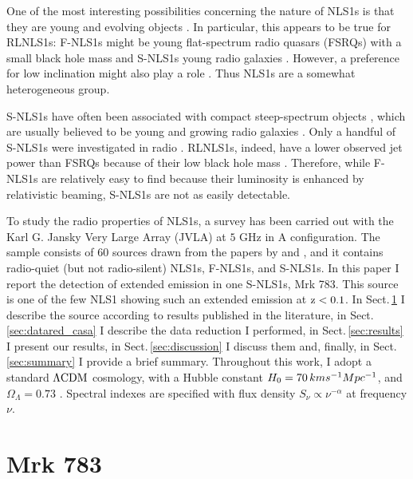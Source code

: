 \documentclass[../thesis.tex]{subfiles}
\begin{document}
One of the most interesting possibilities concerning the nature of NLS1s is that they are young and evolving objects \citep{Mathur00}.
In particular, this appears to be true for RLNLS1s: F-NLS1s might be young flat-spectrum radio quasars (FSRQs) with a small black hole mass and S-NLS1s young radio galaxies \citep{Foschini15, Berton16c}.
However, a preference for low inclination might also play a role \citep[e.g.,][]{Shen14,Peterson11}.
Thus NLS1s are a somewhat heterogeneous group.

S-NLS1s have often been associated with compact steep-spectrum objects \citep[CSS;][]{Oshlack01, Komossa06, Gallo06a, Yuan08, Caccianiga14, Gu15, Schulz16, Berton16c, Caccianiga17}, which are usually believed to be young and growing radio galaxies \citep{Fanti95}. 
Only a handful of S-NLS1s were investigated in radio \citep{Whalen06, Anton08, Doi12, Richards15, Doi15, Gu15, Caccianiga17}. 
RLNLS1s, indeed, have a lower observed jet power than FSRQs \citep{Foschini15} because of their low black hole mass \citep{Heinz03,Foschini14}.
Therefore, while F-NLS1s are relatively easy to find because their luminosity is enhanced by relativistic beaming, S-NLS1s are not as easily detectable.

To study the radio properties of NLS1s, a survey has been carried out with the Karl G. Jansky Very Large Array (JVLA) at $5$ GHz in A configuration.
The sample consists of 60 sources drawn from the papers by \citet{Foschini15} and \citet{Berton15a}, and it contains radio-quiet (but not radio-silent) NLS1s, F-NLS1s, and S-NLS1s.
In this paper I report the detection of extended emission in one S-NLS1s, Mrk 783. 
This source is one of the few NLS1 showing such an extended emission at $\rm z<0.1$.  
In Sect.\,\ref{sec:mrk783} I describe the source according to results published in the literature, in Sect.\,\ref{sec:datared_casa} I describe the data reduction I performed, in Sect.\,\ref{sec:results} I present our results, in Sect.\,\ref{sec:discussion} I discuss them and, finally, in Sect.\,\ref{sec:summary} I provide a brief summary. 
Throughout this work, I adopt a standard $\rm \Lambda CDM$ cosmology, with a Hubble constant $H_0 = 70\,km s^{-1} Mpc^{-1}$, and $\Omega_\Lambda = 0.73$ \citep{Komatsu11}.
Spectral indexes are specified with flux density $S_{\nu} \propto \nu^{-\alpha}$ at frequency $\nu$.


\section{Mrk 783}
\label{sec:mrk783}
\end{document}
